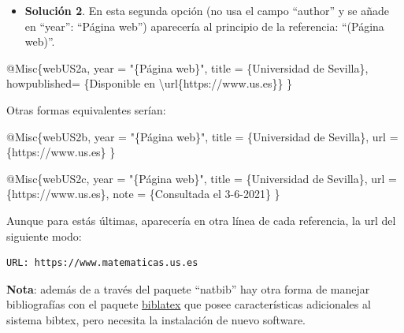 \documentclass[12pt,a4paper,oneside,]{book}
\newenvironment{Shaded}{\begin{snugshade}}{\end{snugshade}}
\newcommand{\CharTok}[1]{\textcolor[rgb]{0.31,0.60,0.02}{#1}}
\newcommand{\DataTypeTok}[1]{\textcolor[rgb]{0.13,0.29,0.53}{#1}}
\newcommand{\NormalTok}[1]{#1}
\newcommand{\OtherTok}[1]{\textcolor[rgb]{0.56,0.35,0.01}{#1}}
\newcommand{\StringTok}[1]{\textcolor[rgb]{0.31,0.60,0.02}{#1}}
\newcommand{\VariableTok}[1]{\textcolor[rgb]{0.00,0.00,0.00}{#1}}
\providecommand{\tightlist}{%
  \setlength{\itemsep}{0pt}\setlength{\parskip}{0pt}}
\numberwithin{dummy}{section}
\theoremstyle{ocrenumbox}
\theoremstyle{blacknumex}
\theoremstyle{blacknumbox}
\theoremstyle{ocrenum}
\theoremstyle{ocrenum}
\begin{document}
\begin{itemize}
\tightlist
\item
  \textbf{Solución 2}. En esta segunda opción (no usa el campo
  ``author'' y se añade en ``year'': ``Página web'') aparecería al
  principio de la referencia: ``(Página web)''.
\end{itemize}

\begin{Shaded}
\begin{Highlighting}[]
\VariableTok{@Misc}\NormalTok{\{}\OtherTok{webUS2a}\NormalTok{,}
  \DataTypeTok{year}\NormalTok{ = "}\StringTok{\{Página web\}}\NormalTok{",}
  \DataTypeTok{title}\NormalTok{ = \{Universidad de Sevilla\},}
  \DataTypeTok{howpublished}\NormalTok{= \{Disponible en }\CharTok{\textbackslash{}url}\NormalTok{\{https://www.us.es\}\}}
\NormalTok{\}}
\end{Highlighting}
\end{Shaded}

Otras formas equivalentes serían:

\begin{Shaded}
\begin{Highlighting}[]
\VariableTok{@Misc}\NormalTok{\{}\OtherTok{webUS2b}\NormalTok{,}
  \DataTypeTok{year}\NormalTok{ = "}\StringTok{\{Página web\}}\NormalTok{",}
  \DataTypeTok{title}\NormalTok{ = \{Universidad de Sevilla\},}
  \DataTypeTok{url}\NormalTok{ = \{https://www.us.es\}}
\NormalTok{\}}
\end{Highlighting}
\end{Shaded}

\begin{Shaded}
\begin{Highlighting}[]
\VariableTok{@Misc}\NormalTok{\{}\OtherTok{webUS2c}\NormalTok{,}
  \DataTypeTok{year}\NormalTok{ = "}\StringTok{\{Página web\}}\NormalTok{",}
  \DataTypeTok{title}\NormalTok{ = \{Universidad de Sevilla\},}
  \DataTypeTok{url}\NormalTok{ = \{https://www.us.es\},}
  \DataTypeTok{note}\NormalTok{ = \{Consultada el 3{-}6{-}2021\}}
\NormalTok{\}}
\end{Highlighting}
\end{Shaded}

Aunque para estás últimas, aparecería en otra línea de cada referencia,
la url del siguiente modo:

\begin{verbatim}
URL: https://www.matematicas.us.es
\end{verbatim}

\textbf{Nota}: además de a través del paquete ``natbib'' hay otra forma
de manejar bibliografías con el paquete
\href{https://www.overleaf.com/learn/latex/Bibliography_management_with_biblatex}{biblatex}
que posee características adicionales al sistema bibtex, pero necesita
la instalación de nuevo software.
\end{document}
